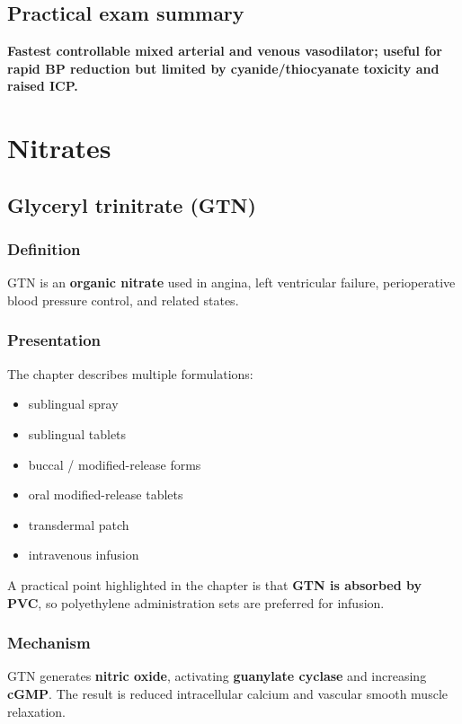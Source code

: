 \documentclass[11pt,a4paper]{article}
\begin{document}
\subsection{Practical exam summary}

\textbf{Fastest controllable mixed arterial and venous vasodilator; useful for rapid BP reduction but limited by cyanide/thiocyanate toxicity and raised ICP.}

\section{Nitrates}

\subsection{Glyceryl trinitrate (GTN)}

\subsubsection*{Definition}

GTN is an \textbf{organic nitrate} used in angina, left ventricular failure, perioperative blood pressure control, and related states.

\subsubsection*{Presentation}

The chapter describes multiple formulations:
\begin{itemize}
    \item sublingual spray
    \item sublingual tablets
    \item buccal / modified-release forms
    \item oral modified-release tablets
    \item transdermal patch
    \item intravenous infusion
\end{itemize}

A practical point highlighted in the chapter is that \textbf{GTN is absorbed by PVC}, so polyethylene administration sets are preferred for infusion.

\subsubsection*{Mechanism}

GTN generates \textbf{nitric oxide}, activating \textbf{guanylate cyclase} and increasing \textbf{cGMP}. The result is reduced intracellular calcium and vascular smooth muscle relaxation.
\end{document}
